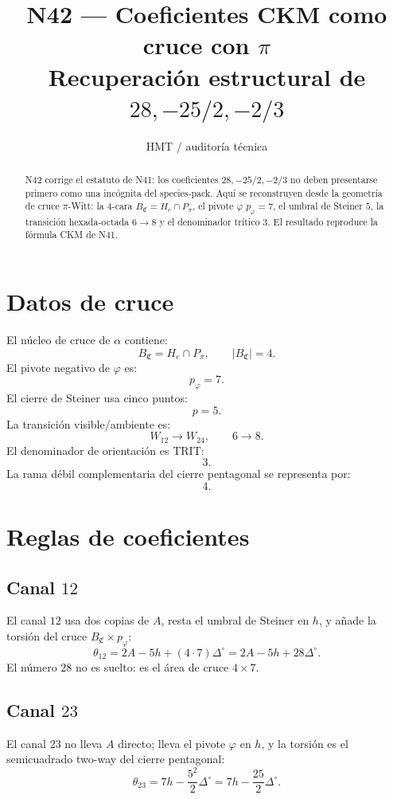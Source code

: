 \documentclass[11pt,a4paper]{article}
\title{\bfseries N42 --- Coeficientes CKM como cruce con \(\pi\)\\
\large Recuperación estructural de \(28,-25/2,-2/3\)}
\author{HMT / auditoría técnica}
\date{}
\begin{document}
\maketitle

\begin{abstract}
N42 corrige el estatuto de N41: los coeficientes \(28,-25/2,-2/3\) no deben presentarse primero como una incógnita del species-pack. Aquí se reconstruyen desde la geometría de cruce \(\pi\)-Witt: la \(4\)-cara \(B_{\mathfrak C}=H_e\cap P_\pi\), el pivote \(\varphi\) \(p_\varphi=7\), el umbral de Steiner \(5\), la transición hexada-octada \(6\to8\) y el denominador trítico \(3\). El resultado reproduce la fórmula CKM de N41.
\end{abstract}

\section{Datos de cruce}

El núcleo de cruce de \(\alpha\) contiene:
\[
B_{\mathfrak C}=H_e\cap P_\pi,\qquad |B_{\mathfrak C}|=4.
\]
El pivote negativo de \(\varphi\) es:
\[
p_\varphi=7.
\]
El cierre de Steiner usa cinco puntos:
\[
p=5.
\]
La transición visible/ambiente es:
\[
W_{12}\to W_{24},\qquad 6\to8.
\]
El denominador de orientación es TRIT:
\[
3.
\]
La rama débil complementaria del cierre pentagonal se representa por:
\[
4.
\]

\section{Reglas de coeficientes}

\subsection*{Canal \(12\)}
El canal \(12\) usa dos copias de \(A\), resta el umbral de Steiner en \(h\), y añade la torsión del cruce \(B_{\mathfrak C}\times p_\varphi\):
\[
\boxed{
\theta_{12}=2A-5h+(4\cdot7)\Delta^\circ
=
2A-5h+28\Delta^\circ.
}
\]
El número \(28\) no es suelto: es el área de cruce \(4\times7\).

\subsection*{Canal \(23\)}
El canal \(23\) no lleva \(A\) directo; lleva el pivote \(\varphi\) en \(h\), y la torsión es el semicuadrado two-way del cierre pentagonal:
\[
\boxed{
\theta_{23}=7h-\frac{5^2}{2}\Delta^\circ
=
7h-\frac{25}{2}\Delta^\circ.
}
\]
\end{document}

